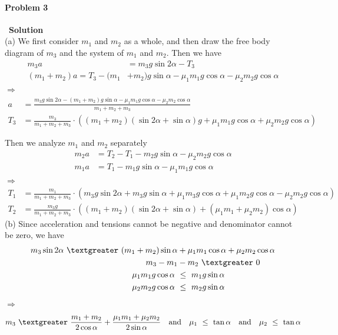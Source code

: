 \documentclass[12pt,a4paper]{article}
\begin{document}
\paragraph{\large \textbf{Problem 3}}~{\textbf{Solution}}
\vspace{2mm}\\
\noindent (a) We first consider $m_1$ and $m_2$ as a whole, and then draw the free body diagram of $m_3$ and the system of $m_1$ and $m_2$. Then we have
\begin{align*}
	m_3 a &= m_3g\sin2\alpha - T_3\\
	(m_1 + m_2)a = T_3 - (m_1 &+ m_2)g\sin\alpha - \mu_1m_1g\cos\alpha - \mu_2m_2g\cos\alpha
\end{align*}
$\Rightarrow$
\begin{align*}
	a &= \frac{m_3g\sin2\alpha - (m_1 + m_2)g\sin\alpha - \mu_1m_1g\cos\alpha - \mu_2m_2\cos\alpha}{m_1 + m_2 + m_3}\\
	T_3 &= \frac{m_3}{m_1 + m_2 + m_3}\cdot \left(
		(m_1 + m_2)(\sin2\alpha + \sin\alpha)g + \mu_1m_1g\cos\alpha + \mu_2m_2g\cos\alpha
	\right)
\end{align*}
\par Then we analyze $m_1$ and $m_2$ separately
\begin{align*}
	m_2a &= T_2 - T_1 - m_2g\sin\alpha - \mu_2m_2g\cos\alpha\\
	m_1a &= T_1 - m_1g\sin\alpha - \mu_1m_1g\cos\alpha
\end{align*}
$\Rightarrow$
\begin{align*}
	T_1 &= \frac{m_1}{m_1 + m_2 + m_3}\cdot \left(
		m_3g\sin2\alpha + m_3g\sin\alpha + \mu_1m_3g\cos\alpha + \mu_1m_2g\cos\alpha - \mu_2m_2g\cos\alpha
	\right)\\
	T_2 &= \frac{m_3g}{m_1 + m_2 + m_3}\cdot \left(
		(m_1 + m_2)(\sin2\alpha + \sin\alpha) + (\mu_1m_1 + \mu_2m_2)\cos\alpha
	\right)
\end{align*}
\noindent (b) Since acceleration and tensions cannot be negative and denominator cannot be zero, we have
\begin{align*}
	m_3\sin2\alpha\ \textgreater\ (m_1 + m_2)\sin\alpha &+ \mu_1m_1\cos\alpha + \mu_2m_2\cos\alpha\\
	m_3 - m_1 &- m_2\ \textgreater\ 0\\
	\mu_1m_1g\cos\alpha\ &\leq\ m_1g\sin\alpha\\
	\mu_2m_2g\cos\alpha\ &\leq\ m_2g\sin\alpha
\end{align*}
$\Rightarrow$
\begin{align*}
	m_3\ \textgreater\ \frac{m_1 + m_2}{2\cos\alpha} + \frac{\mu_1m_1 + \mu_2m_2}{2\sin\alpha}\quad \text{and} \quad \mu_1\ \leq\ \tan\alpha\quad \text{and} \quad \mu_2\ \leq\ \tan\alpha
\end{align*}
\end{document}
